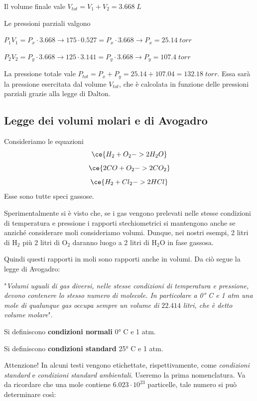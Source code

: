 Il volume finale vale $V_{tot}=V_1 + V_2 =3.668 \; L$

Le pressioni parziali valgono

\vspace{0.2cm}$P_1V_1=P_x \cdot 3.668 \rightarrow 175 \cdot 0.527 = P_x \cdot 3.668 \rightarrow P_x = 25.14 \; torr$

\vspace{0.2cm}$P_2V_2=P_y \cdot 3.668 \rightarrow 125 \cdot 3.141 = P_y \cdot 3.668 \rightarrow P_y = 107.4 \; torr$

\vspace{0.2cm}La pressione totale vale $P_{tot}=P_x + P_y=25.14 + 107.04=132.18 \; torr$. Essa sarà la pressione esercitata dal volume $V_{tot}$, che è calcolata in funzione delle pressioni parziali grazie alla legge di Dalton.
\subsection{Legge dei volumi molari e di Avogadro}
Consideriamo le equazioni
$$\ce{H_2 + O_2 -> 2H_2O}$$
$$\ce{2CO + O_2 -> 2CO_2}$$
$$\ce{H_2 + Cl_2 -> 2HCl}$$
Esse sono tutte speci gassose.

Sperimentalmente si è visto che, se i gas vengono prelevati nelle stesse condizioni di temperatura e pressione i rapporti stechiometrici si mantengono anche se anziché considerare moli consideriamo volumi. Dunque, nei nostri esempi, 2 litri di H$_2$ più 2 litri di O$_2$ daranno luogo a 2 litri di H$_2$O in fase gassosa.

Quindi questi rapporti in moli sono rapporti anche in volumi. Da ciò segue la legge di Avogadro:

\vspace{0.2cm}"\textit{Volumi uguali di gas diversi, nelle stesse condizioni di temperatura e pressione, devono contenere lo stesso numero di molecole. In particolare a 0° C e 1 atm una mole di qualunque gas occupa sempre un volume di} $22.414$ \textit{litri, che è detto volume molare}".

\vspace{0.2cm}Si definiscono \textbf{condizioni normali} 0° C e 1 atm.

\vspace{0.2cm}Si definiscono \textbf{condizioni standard} 25° C e 1 atm.

\vspace{0.2cm}Attenzione! In alcuni testi vengono etichettate, rispettivamente, come \textit{condizioni standard} e \textit{condizioni standard ambientali}. Useremo la prima nomenclatura.
Va da ricordare che una mole contiene $6.023 \cdot 10^{23}$ particelle, tale numero si può determinare così:


